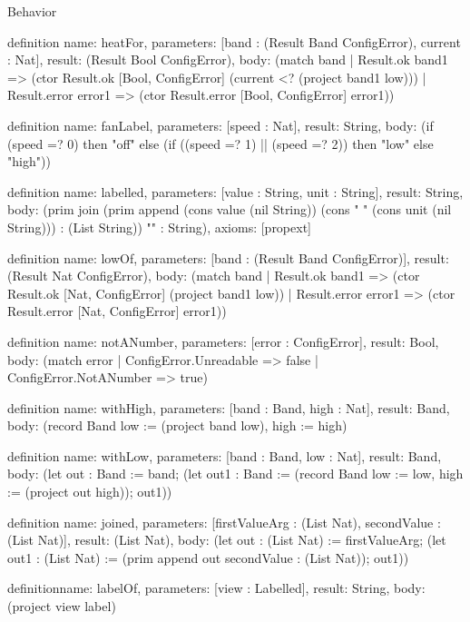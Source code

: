 \begin{lexlean}{Behavior}
\begin{semanticmodule}
definition{
  name: heatFor,
  parameters: [band : (Result Band ConfigError), current : Nat],
  result: (Result Bool ConfigError),
  body: (match band
    | Result.ok band1 => (ctor Result.ok [Bool, ConfigError] (current <? (project band1 low)))
    | Result.error error1 => (ctor Result.error [Bool, ConfigError] error1))
}

definition{
  name: fanLabel,
  parameters: [speed : Nat],
  result: String,
  body: (if (speed =? 0) then "off" else (if ((speed =? 1) || (speed =? 2)) then "low" else "high"))
}

definition{
  name: labelled,
  parameters: [value : String, unit : String],
  result: String,
  body: (prim join (prim append (cons value (nil String)) (cons " " (cons unit (nil String))) : (List String)) "" : String),
  axioms: [propext]
}

definition{
  name: lowOf,
  parameters: [band : (Result Band ConfigError)],
  result: (Result Nat ConfigError),
  body: (match band
    | Result.ok band1 => (ctor Result.ok [Nat, ConfigError] (project band1 low))
    | Result.error error1 => (ctor Result.error [Nat, ConfigError] error1))
}

definition{
  name: notANumber,
  parameters: [error : ConfigError],
  result: Bool,
  body: (match error | ConfigError.Unreadable => false | ConfigError.NotANumber => true)
}

definition{
  name: withHigh,
  parameters: [band : Band, high : Nat],
  result: Band,
  body: (record Band {low := (project band low), high := high})
}

definition{
  name: withLow,
  parameters: [band : Band, low : Nat],
  result: Band,
  body: (let out : Band := band; (let out1 : Band := (record Band {low := low, high := (project out high)}); out1))
}

definition{
  name: joined,
  parameters: [firstValueArg : (List Nat), secondValue : (List Nat)],
  result: (List Nat),
  body: (let out : (List Nat) := firstValueArg; (let out1 : (List Nat) := (prim append out secondValue : (List Nat)); out1))
}

definition{name: labelOf, parameters: [view : Labelled], result: String, body: (project view label)}


\end{semanticmodule}
\end{lexlean}
